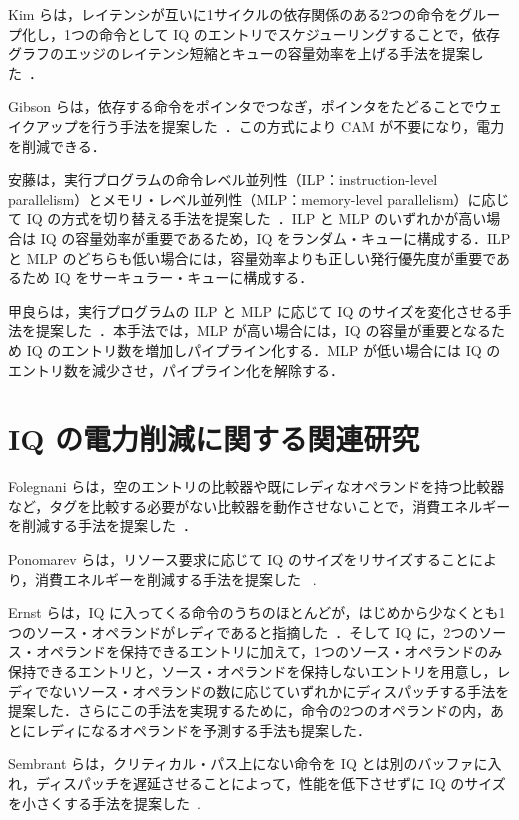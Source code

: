 Kim らは，レイテンシが互いに1サイクルの依存関係のある2つの命令をグループ化し，1つの命令として IQ のエントリでスケジューリングすることで，依存グラフのエッジのレイテンシ短縮とキューの容量効率を上げる手法を提案した~\cite{Kim2003}．

Gibson らは，依存する命令をポインタでつなぎ，ポインタをたどることでウェイクアップを行う手法を提案した~\cite{Gibson2010}．この方式により CAM が不要になり，電力を削減できる．

安藤は，実行プログラムの命令レベル並列性（ILP：instruction-level parallelism）とメモリ・レベル並列性（MLP：memory-level parallelism）に応じて IQ の方式を切り替える手法を提案した~\cite{Ando2019}．ILP と MLP のいずれかが高い場合は IQ の容量効率が重要であるため，IQ をランダム・キューに構成する．ILP と MLP のどちらも低い場合には，容量効率よりも正しい発行優先度が重要であるため IQ をサーキュラー・キューに構成する．

甲良らは，実行プログラムの ILP と MLP に応じて IQ のサイズを変化させる手法を提案した~\cite{Kora2013}．本手法では，MLP が高い場合には，IQ の容量が重要となるため IQ のエントリ数を増加しパイプライン化する．MLP が低い場合には IQ のエントリ数を減少させ，パイプライン化を解除する．

\section{IQ の電力削減に関する関連研究}
\label{sec:relate_energy}
Folegnani らは，空のエントリの比較器や既にレディなオペランドを持つ比較器など，タグを比較する必要がない比較器を動作させないことで，消費エネルギーを削減する手法を提案した~\cite{folegnani2001}．

Ponomarev らは，リソース要求に応じて IQ のサイズをリサイズすることにより，消費エネルギーを削減する手法を提案した~\cite{ponomarev2001} .

Ernst らは，IQ に入ってくる命令のうちのほとんどが，はじめから少なくとも1つのソース・オペランドがレディであると指摘した~\cite{ernst2002}．そして IQ に，2つのソース・オペランドを保持できるエントリに加えて，1つのソース・オペランドのみ保持できるエントリと，ソース・オペランドを保持しないエントリを用意し，レディでないソース・オペランドの数に応じていずれかにディスパッチする手法を提案した．さらにこの手法を実現するために，命令の2つのオペランドの内，あとにレディになるオペランドを予測する手法も提案した．

Sembrant らは，クリティカル・パス上にない命令を IQ とは別のバッファに入れ，ディスパッチを遅延させることによって，性能を低下させずに IQ のサイズを小さくする手法を提案した~\cite{Sembrant2015}.

